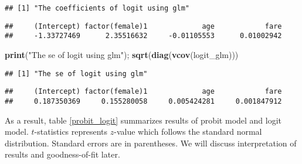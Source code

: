 \documentclass[
  12pt,
]{article}
\newenvironment{Shaded}{\begin{snugshade}}{\end{snugshade}}
\newcommand{\KeywordTok}[1]{\textcolor[rgb]{0.13,0.29,0.53}{\textbf{#1}}}
\newcommand{\NormalTok}[1]{#1}
\newcommand{\StringTok}[1]{\textcolor[rgb]{0.31,0.60,0.02}{#1}}
\begin{document}
\begin{verbatim}
## [1] "The coefficients of logit using glm"
\end{verbatim}

\begin{verbatim}
##     (Intercept) factor(female)1             age            fare 
##     -1.33727469      2.35516632     -0.01105553      0.01002942
\end{verbatim}

\begin{Shaded}
\begin{Highlighting}[]
\KeywordTok{print}\NormalTok{(}\StringTok{"The se of logit using glm"}\NormalTok{); }\KeywordTok{sqrt}\NormalTok{(}\KeywordTok{diag}\NormalTok{(}\KeywordTok{vcov}\NormalTok{(logit\_glm)))}
\end{Highlighting}
\end{Shaded}

\begin{verbatim}
## [1] "The se of logit using glm"
\end{verbatim}

\begin{verbatim}
##     (Intercept) factor(female)1             age            fare 
##     0.187350369     0.155280058     0.005424281     0.001847912
\end{verbatim}

As a result, table \ref{probit_logit} summarizes results of probit model
and logit model. \(t\)-statistics represents \(z\)-value which follows
the standard normal distribution. Standard errors are in parentheses. We
will discuss interpretation of results and goodness-of-fit later.
\end{document}
